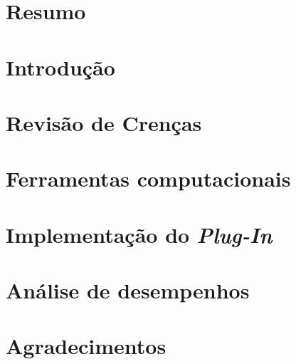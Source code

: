 \documentclass[12pt, a4paper]{report}
\begin{document}
	
	\chapter*{Resumo}
	\chapter{Introdução}
	
	
	
	
	\chapter{Revisão de Crenças}
	\chapter{Ferramentas computacionais}
	\chapter{Implementação do \textit{Plug-In}}
	\chapter{Análise de desempenhos}
	\chapter*{Agradecimentos}
	
	
	
	 
\end{document}
